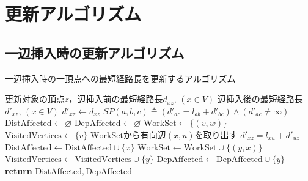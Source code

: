 \chapter{更新アルゴリズム}
\label{chap:algorithm-on-insert}

\section{一辺挿入時の更新アルゴリズム}
\label{sect:update-dist-on-insert}

\begin{algorithm}[H]
  \caption{一辺挿入時の一頂点への最短経路長を更新するアルゴリズム}
  \label{algo:update-dist-on-insert}
  \begin{algorithmic}[1]
    \Require 更新対象の頂点$z$，辺挿入前の最短経路長$d_{xz},\,(x\in V)$
    \Ensure 辺挿入後の最短経路長$d'_{xz},\,(x\in V)$
    \State $d'_{xz}\gets d_{xz}$
    \State $SP(a,b,c)\triangleq(d'_{ac}=l_{ab}+d'_{bc})\land(d'_{ac}\neq\infty)$
    \State $\mathrm{DistAffected}\gets\varnothing$
    \State $\mathrm{DepAffected}\gets\varnothing$
    \State $\mathrm{WorkSet}\gets\{(v,w)\}$
    \State $\mathrm{VisitedVertices}\gets\{v\}$
    \State $\mathrm{WorkSet}$から有向辺$(x,u)$を取り出す
    \State $d'_{xz}=l_{xu}+d'_{uz}$
    \State $\mathrm{DistAffected}\gets\mathrm{DistAffected}\cup\{x\}$
    \State $\mathrm{WorkSet}\gets\mathrm{WorkSet}\cup\{(y,x)\}$
    \State $\mathrm{VisitedVertices}\gets\mathrm{VisitedVertices}\cup\{y\}$
    \EndFor
    \State $\mathrm{DepAffected}\gets\mathrm{DepAffected}\cup\{y\}$
    \EndFor
    \EndIf
    \EndWhile
    \State \textbf{return} $\mathrm{DistAffected},\mathrm{DepAffected}$
    \EndProcedure
  \end{algorithmic}
\end{algorithm}

